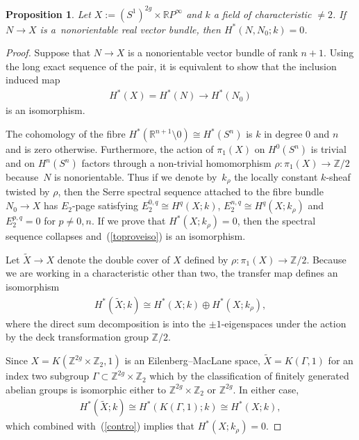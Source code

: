 \documentclass[10pt,a4paper]{amsart}
\numberwithin{equation}{section}
\newtheorem{Proposition}[Theorem]{Proposition}
\begin{document}
\begin{Proposition}\label{iszero}
Let $X := (S^1)^{2g} \times {\mathbb R} P^{\infty} $ and $k$ a field of characteristic $ \neq 2$. If $N \rightarrow X$ is a~nonorientable real vector bundle, then $H^*(N, N_0;k) = 0$.
\end{Proposition}

\begin{proof}
Suppose that $N \rightarrow X$ is a nonorientable vector bundle of rank $n+1$. Using the long exact sequence of the pair, it is equivalent to show that the inclusion induced map
\begin{gather}\label{toproveiso}
H^*(X) = H^*(N) \rightarrow H^*(N_0)
\end{gather} is an isomorphism.

The cohomology of the f\/ibre $H^*({\mathbb R}^{n+1} \setminus 0) \cong H^*(S^n)$ is $k$ in degree $0$ and $n$ and is zero otherwise. Furthermore, the action of $\pi_1(X)$ on $H^0(S^n)$ is trivial and on $H^n(S^n)$ factors through a non-trivial homomorphism $ \rho\colon \pi_1(X) \rightarrow {\mathbb Z}/2$ because~$N$ is nonorientable. Thus if we denote by~$k_{\rho}$ the locally constant $k$-sheaf twisted by $\rho$, then the Serre spectral sequence attached to the f\/ibre bundle $N_0 \rightarrow X $
has $E_2$-page satisfying $E_2^{0,q} \cong H^q(X;k)$, $E_2^{n,q} \cong H^q(X;k_{\rho})$ and $E_2^{p,q} =0$ for $p\neq 0, n$. If we prove that $H^*(X;k_{\rho})=0$, then the spectral sequence collapses and~(\ref{toproveiso}) is an isomorphism.

Let $\tilde{X} \rightarrow X$ denote the double cover of $X$ def\/ined by $ \rho\colon \pi_1(X) \rightarrow {\mathbb Z}/2$. Because we are working in a characteristic other than two, the transfer map def\/ines an isomorphism
\begin{gather}\label{contro}
H^*(\tilde{X};k) \cong H^*(X;k) \oplus H^*(X; k_{\rho}),
\end{gather}
where the direct sum decomposition is into the $\pm 1$-eigenspaces under the action by the deck transformation group ${\mathbb Z}/2$.

Since $X = K({\mathbb Z}^{2g}\times {\mathbb Z}_2, 1)$ is an Eilenberg--MacLane space, $\tilde{X} = K(\Gamma, 1)$ for an index two subgroup $ \Gamma \subset {\mathbb Z}^{2g}\times {\mathbb Z}_2$ which by the classif\/ication of f\/initely generated abelian groups is isomorphic either to $ {\mathbb Z}^{2g} \times {\mathbb Z}_2$ or $ {\mathbb Z}^{2g}$. In either case, \begin{gather*}H^*(\tilde{X};k) \cong H^*(K(\Gamma,1);k) \cong H^*(X; k), \end{gather*} which combined with~(\ref{contro}) implies that $H^*(X; k_{\rho})=0$.
\end{proof}
\end{document}
